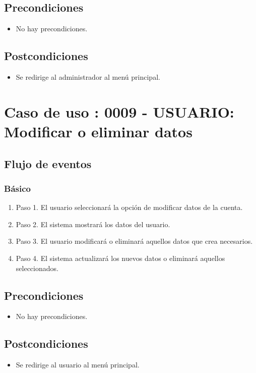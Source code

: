 \subsection{Precondiciones}
\begin{itemize}
\item No hay precondiciones.
\end{itemize}

\subsection{Postcondiciones}
\begin{itemize}
\item Se redirige al administrador al menú principal.
\end{itemize}



\section{Caso de uso : 0009 - USUARIO: Modificar o eliminar datos}\label{sec:uc0}
\subsection{Flujo de eventos}
\subsubsection{Básico}

\begin{enumerate}
\item Paso 1.
El usuario seleccionará la opción de modificar datos de la cuenta.
\item Paso 2.
El sistema mostrará los datos del usuario.
\item Paso 3.
El usuario modificará o eliminará aquellos datos que crea necesarios.
\item Paso 4.
El sistema actualizará los nuevos datos o eliminará aquellos seleccionados.
\end{enumerate}

\subsection{Precondiciones}
\begin{itemize}
\item No hay precondiciones.
\end{itemize}

\subsection{Postcondiciones}
\begin{itemize}
\item Se redirige al usuario al menú principal.
\end{itemize}



